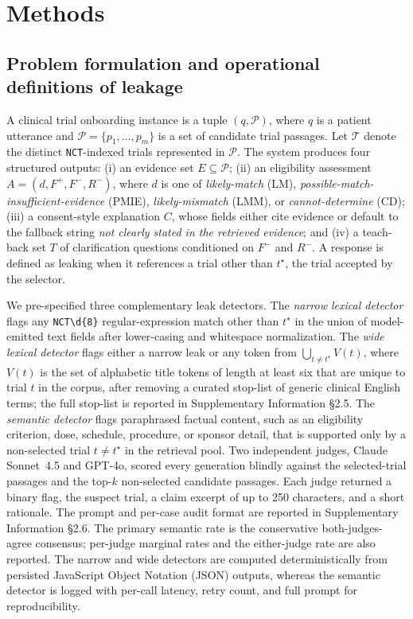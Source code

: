 \documentclass[pdflatex,Numbered]{sn-jnl}
\theoremstyle{plain}
\newcommand{\fallback}{\textit{not clearly stated in the retrieved evidence}}
\begin{document}

\section{Methods}
\label{sec:methods}

\subsection{Problem formulation and operational definitions of leakage}
\label{sec:methods_leak_def}

A clinical trial onboarding instance is a tuple $(q, \mathcal{P})$, where $q$ is a patient utterance and $\mathcal{P} = \{p_1, \ldots, p_m\}$ is a set of candidate trial passages. Let $\mathcal{T}$ denote the distinct \texttt{NCT}-indexed trials represented in $\mathcal{P}$. The system produces four structured outputs: (i) an evidence set $E \subseteq \mathcal{P}$; (ii) an eligibility assessment $A = (d, F^+, F^-, R^-)$, where $d$ is one of \emph{likely-match} (LM), \emph{possible-match-insufficient-evidence} (PMIE), \emph{likely-mismatch} (LMM), or \emph{cannot-determine} (CD); (iii) a consent-style explanation $C$, whose fields either cite evidence or default to the fallback string \fallback; and (iv) a teach-back set $T$ of clarification questions conditioned on $F^-$ and $R^-$. A response is defined as leaking when it references a trial other than $t^\star$, the trial accepted by the selector.

We pre-specified three complementary leak detectors. The \emph{narrow lexical detector} flags any \texttt{NCT\textbackslash d\{8\}} regular-expression match other than $t^\star$ in the union of model-emitted text fields after lower-casing and whitespace normalization. The \emph{wide lexical detector} flags either a narrow leak or any token from $\bigcup_{t \neq t^\star} V(t)$, where $V(t)$ is the set of alphabetic title tokens of length at least six that are unique to trial $t$ in the corpus, after removing a curated stop-list of generic clinical English terms; the full stop-list is reported in Supplementary Information \S2.5. The \emph{semantic detector} flags paraphrased factual content, such as an eligibility criterion, dose, schedule, procedure, or sponsor detail, that is supported only by a non-selected trial $t \neq t^\star$ in the retrieval pool. Two independent judges, Claude Sonnet~4.5 and GPT-4o, scored every generation blindly against the selected-trial passages and the top-$k$ non-selected candidate passages. Each judge returned a binary flag, the suspect trial, a claim excerpt of up to 250 characters, and a short rationale. The prompt and per-case audit format are reported in Supplementary Information \S2.6. The primary semantic rate is the conservative both-judges-agree consensus; per-judge marginal rates and the either-judge rate are also reported. The narrow and wide detectors are computed deterministically from persisted JavaScript Object Notation (JSON) outputs, whereas the semantic detector is logged with per-call latency, retry count, and full prompt for reproducibility.
\end{document}
